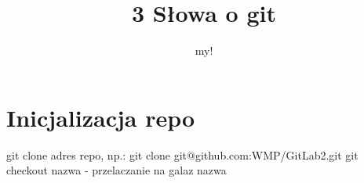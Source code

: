 ﻿\documentclass[12pt,a4paper]{report}
\author{my!}
\title{3 Słowa o git}
\begin{document}
\maketitle

\chapter{Inicjalizacja repo}
git clone adres repo, np.: git clone git@github.com:WMP/GitLab2.git
git checkout nazwa - przelaczanie na galaz nazwa
\end{document}
